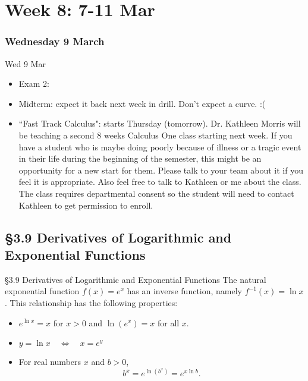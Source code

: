 \documentclass[cal1spr16Lectures.tex]{subfiles}
\begin{document}
\section[Week 8]{Week 8: 7-11 Mar}

\subsubsection{\bf Wednesday 9 March}

\begin{frame}[allowframebreaks]{Wed 9 Mar}
\begin{itemize}\footnotesize
\item Exam 2: 
\item Midterm: expect it back next week in drill.  Don't expect a curve. :(
\item ``Fast Track Calculus": starts Thursday (tomorrow).  Dr. Kathleen Morris will be teaching a second 8 weeks Calculus One class starting next week.  If you have a student who is maybe doing poorly because of illness or a tragic event in their life during the beginning of the semester, this might be an opportunity for a new start for them.  Please talk to your team about it if you feel it is appropriate.  Also feel free to talk to Kathleen or me about the class.  The class requires departmental consent so the student will need to contact Kathleen to get permission to enroll.
\end{itemize}
\end{frame}

\subsection[3.9 Derivatives of Logarithmic and Exponential Functions]{\S 3.9 Derivatives of Logarithmic and Exponential Functions}

\begin{frame}{\S 3.9 Derivatives of Logarithmic and Exponential Functions}\footnotesize
The natural exponential function $f(x)=e^x$ has an inverse function, namely $f^{-1}(x)=\ln x$.  This relationship has the following properties:
\begin{itemize}
\item[1.] $e^{\ln x}=x $ for $x>0$ and $\ln(e^x)=x$ for all $x$.
\item[2.] $y=\ln x \quad\Longleftrightarrow\quad x=e^y$
\item[3.] For real numbers $x$ and $b>0$, 
\[b^x=e^{\ln (b^x)}=e^{x \ln b}.\]
\end{itemize}
\end{frame}
\end{document}
